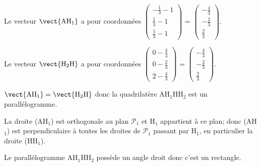 \begin{enumerate}[resume]

Le vecteur $\vect{\text{AH}_1}$ a pour coordonnées
$\begin{pmatrix}
-\frac{1}{3}-1 \\ \frac{1}{3}-1 \\ \frac{5}{3}-1
\end{pmatrix}$
=
$\begin{pmatrix}
-\frac{4}{3} \\ -\frac{2}{3} \\ \frac{2}{3}
\end{pmatrix}$.

Le vecteur $\vect{\text{H}_2\text{H}}$ a pour coordonnées
$\begin{pmatrix}
0- \frac{4}{3}\\ 0- \frac{2}{3} \\ 2- \frac{4}{3}
\end{pmatrix}$
=
$\begin{pmatrix}
-\frac{4}{3} \\ -\frac{2}{3} \\ \frac{2}{3}
\end{pmatrix}$.

$\vect{\text{AH}_1} = \vect{\text{H}_2\text{H}}$ donc la quadrilatère AH$_1$HH$_2$ est un parallélogramme.

La droite (AH$_1$) est orthogonale au plan $\mathcal{P}_1$ et H$_1$  appartient à ce plan; donc (AH$_1$) est perpendiculaire à toutes les droites de $\mathcal{P}_1$ passant par H$_1$, en particulier la droite (HH$_1$).

Le parallélogramme AH$_1$HH$_2$  possède un angle droit donc c'est un rectangle.

\end{enumerate}

\bigskip

